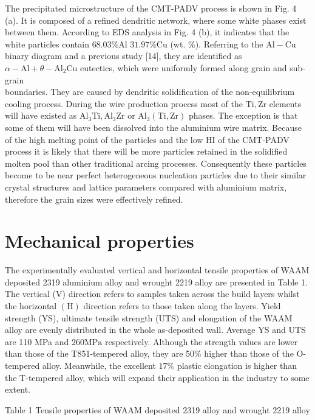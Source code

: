 \documentclass[10pt]{article}
\begin{document}
The precipitated microstructure of the CMT-PADV process is shown in Fig. 4 (a). It is composed of a refined dendritic network, where some white phases exist between them. According to EDS analysis in Fig. 4 (b), it indicates that the white particles contain $68.03 \% \mathrm{Al}$ $31.97 \% \mathrm{Cu}$ (wt. \%). Referring to the $\mathrm{Al}-\mathrm{Cu}$ binary diagram and a previous study [14], they are identified as $\alpha-\mathrm{Al}+\theta-\mathrm{Al}_{2} \mathrm{Cu}$ eutectics, which were uniformly formed along grain and sub-grain\\
boundaries. They are caused by dendritic solidification of the non-equilibrium cooling process. During the wire production process most of the $\mathrm{Ti}, \mathrm{Zr}$ elements will have existed as $\mathrm{Al}_{3} \mathrm{Ti}, \mathrm{Al}_{3} \mathrm{Zr}$ or $\mathrm{Al}_{3}(\mathrm{Ti}, \mathrm{Zr})$ phases. The exception is that some of them will have been dissolved into the aluminium wire matrix. Because of the high melting point of the particles and the low $\mathrm{HI}$ of the CMT-PADV process it is likely that there will be more particles retained in the solidified molten pool than other traditional arcing processes. Consequently these particles become to be near perfect heterogeneous nucleation particles due to their similar crystal structures and lattice parameters compared with aluminium matrix, therefore the grain sizes were effectively refined.

\section*{Mechanical properties}
The experimentally evaluated vertical and horizontal tensile properties of WAAM deposited 2319 aluminium alloy and wrought 2219 alloy are presented in Table 1. The vertical (V) direction refers to samples taken across the build layers whilst the horizontal $(\mathrm{H})$ direction refers to those taken along the layers. Yield strength (YS), ultimate tensile strength (UTS) and elongation of the WAAM alloy are evenly distributed in the whole as-deposited wall. Average YS and UTS are 110 MPa and $260 \mathrm{MPa}$ respectively. Although the strength values are lower than those of the T851-tempered alloy, they are 50\% higher than those of the O-tempered alloy. Meanwhile, the excellent $17 \%$ plastic elongation is higher than the T-tempered alloy, which will expand their application in the industry to some extent.

Table 1 Tensile properties of WAAM deposited 2319 alloy and wrought 2219 alloy
\end{document}
